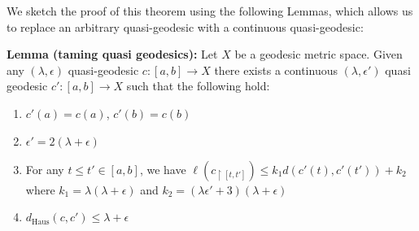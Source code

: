 \documentclass[12pt]{article}
\newcommand{\vs}{\vskip10pt}
\begin{document}
	\vs 
	
	We sketch the proof of this theorem using the following Lemmas, which allows us to replace an arbitrary quasi-geodesic with a continuous quasi-geodesic: 
	
	\vs 
	
	\textbf{Lemma (taming quasi geodesics): } Let $X$ be a geodesic metric space. Given any $(\lambda, \epsilon)$ quasi-geodesic $c: [a,b] \rightarrow X$ there exists a continuous $(\lambda, \epsilon')$ quasi geodesic $c': [a,b] \rightarrow X$ such that the following hold: 
	
	\begin{enumerate}[label = (\roman*)]
		\item $c'(a) = c(a)$, $c'(b) = c(b)$
		\item $\epsilon' = 2(\lambda + \epsilon)$
		\item For any $t \leq t' \in [a,b]$, we have $\ell(c_{\restriction [t, t']}) \leq k_1 d(c'(t), c'(t')) + k_2$ where $k_1 = \lambda (\lambda + \epsilon)$ and $k_2 = (\lambda \epsilon' + 3)(\lambda + \epsilon)$
		\item  $d_{\text{Haus}}(c, c') \leq \lambda + \epsilon$
	\end{enumerate} 
\end{document}
